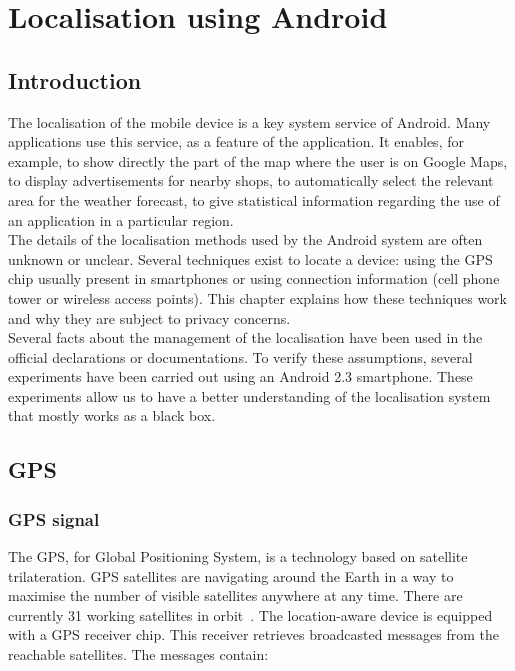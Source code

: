 \chapter{Localisation using Android}
\label{chap:and-loc}

\section*{Introduction}
The localisation of the mobile device is a key system service of Android.
Many applications use this service, as a feature of the application.
It enables, for example, to show directly the part of the map where the user is on Google Maps, to display advertisements for nearby shops, to automatically select the relevant area for the weather forecast, to give statistical information regarding the use of an application in a particular region.\\

The details of the localisation methods used by the Android system are often unknown or unclear.
Several techniques exist to locate a device: using the GPS chip usually present in smartphones or using connection information (cell phone tower or wireless access points).
This chapter explains how these techniques work and why they are subject to privacy concerns.\\

Several facts about the management of the localisation have been used in the official declarations or documentations.
To verify these assumptions, several experiments have been carried out using an Android 2.3 smartphone.
These experiments allow us to have a better understanding of the localisation system that mostly works as a black box.


\section{GPS}
\label{sec:loc-gps}


\subsection{GPS signal}

The GPS, for Global Positioning System, is a technology based on satellite trilateration.
GPS satellites are navigating around the Earth in a way to maximise the number of visible satellites anywhere at any time.
There are currently 31 working satellites in orbit~\cite{pocketgpsworld}.
The location-aware device is equipped with a GPS receiver chip.
This receiver retrieves broadcasted messages from the reachable satellites.
The messages contain:

